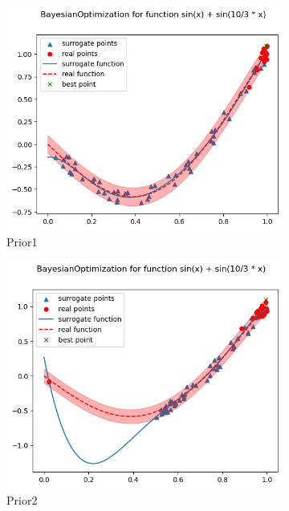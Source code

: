 \begin{figure}[H]
    \begin{subfigure}{0.5\textwidth}
        \includegraphics[width=\textwidth]{lab6/imgs/obj1_pr1.png}
        \caption{Prior1}
    \end{subfigure}
    \begin{subfigure}{0.5\textwidth}
        \includegraphics[width=\textwidth]{lab6/imgs/obj1_pr2.png}
        \caption{Prior2}
    \end{subfigure} \\
    \begin{subfigure}{\textwidth}

\end{subfigure}
\end{figure}
